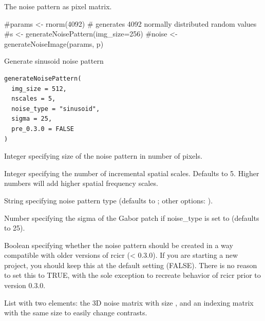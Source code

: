 \documentclass[letterpaper]{book}
\begin{document}
%
\begin{Value}
The noise pattern as pixel matrix.
\end{Value}
%
\begin{Examples}
\begin{ExampleCode}
#params <- rnorm(4092) # generates 4092 normally distributed random values
#s <- generateNoisePattern(img_size=256)
#noise <- generateNoiseImage(params, p)
\end{ExampleCode}
\end{Examples}
%
\begin{Description}
Generate sinusoid noise pattern
\end{Description}
%
\begin{Usage}
\begin{verbatim}
generateNoisePattern(
  img_size = 512,
  nscales = 5,
  noise_type = "sinusoid",
  sigma = 25,
  pre_0.3.0 = FALSE
)
\end{verbatim}
\end{Usage}
%
\begin{Arguments}
\begin{ldescription}
\item[\code{img\_size}] Integer specifying size of the noise pattern in number of pixels.

\item[\code{nscales}] Integer specifying the number of incremental spatial scales. Defaults to 5. Higher numbers will add higher spatial frequency scales.

\item[\code{noise\_type}] String specifying noise pattern type (defaults to ; other options: ).

\item[\code{sigma}] Number specifying the sigma of the Gabor patch if noise\_type is set to  (defaults to 25).

\item[\code{pre\_0.3.0}] Boolean specifying whether the noise pattern should be created in a way compatible with older versions of rcicr (< 0.3.0). If you are starting a new project, you should keep this at the default setting (FALSE). There is no reason to set this to TRUE, with the sole exception to recreate behavior of rcicr prior to version 0.3.0.
\end{ldescription}
\end{Arguments}
%
\begin{Value}
List with two elements: the 3D noise matrix with size , and an indexing
matrix with the same size to easily change contrasts.
\end{Value}
\end{document}
